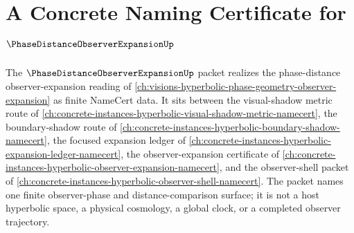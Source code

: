 \chapter{A Concrete Naming Certificate for $\PhaseDistanceObserverExpansionUp$}
\label{ch:concrete-instances-phase-distance-observer-expansion-namecert}

The $\PhaseDistanceObserverExpansionUp$ packet realizes the phase-distance observer-expansion reading of \autoref{ch:visions-hyperbolic-phase-geometry-observer-expansion} as finite NameCert data. It sits between the visual-shadow metric route of \autoref{ch:concrete-instances-hyperbolic-visual-shadow-metric-namecert}, the boundary-shadow route of \autoref{ch:concrete-instances-hyperbolic-boundary-shadow-namecert}, the focused expansion ledger of \autoref{ch:concrete-instances-hyperbolic-expansion-ledger-namecert}, the observer-expansion certificate of \autoref{ch:concrete-instances-hyperbolic-observer-expansion-namecert}, and the observer-shell packet of \autoref{ch:concrete-instances-hyperbolic-observer-shell-namecert}. The packet names one finite observer-phase and distance-comparison surface; it is not a host hyperbolic space, a physical cosmology, a global clock, or a completed observer trajectory.



